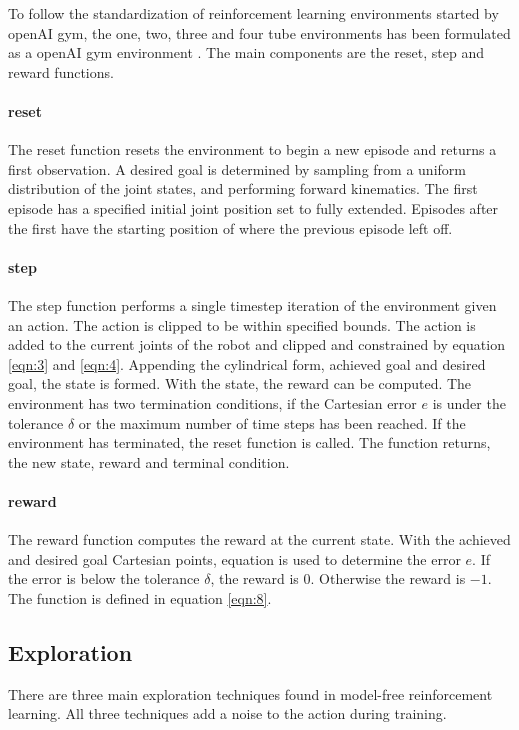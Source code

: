 To follow the standardization of reinforcement learning environments started by openAI gym, the one, two, three and four tube environments has been formulated as a openAI gym environment \cite{Brockman2016}. The main components are the reset, step and reward functions.

\paragraph{reset} The reset function resets the environment to begin a new episode and returns a first observation. A desired goal is determined by sampling from a uniform distribution of the joint states, and performing forward kinematics. The first episode has a specified initial joint position set to fully extended. Episodes after the first have the starting position of where the previous episode left off.

\paragraph{step} The step function performs a single timestep iteration of the environment given an action. The action is clipped to be within specified bounds. The action is added to the current joints of the robot and clipped and constrained by equation \ref{eqn:3} and \ref{eqn:4}. Appending the cylindrical form, achieved goal and desired goal, the state is formed. With the state, the reward can be computed. The environment has two termination conditions, if the Cartesian error $e$ is under the tolerance $\delta$ or the maximum number of time steps has been reached. If the environment has terminated, the reset function is called. The function returns, the new state, reward and terminal condition. 

\paragraph{reward} The reward function computes the reward at the current state. With the achieved and desired goal Cartesian points, equation is used to determine the error $e$. If the error is below the tolerance $\delta$, the reward is $0$. Otherwise the reward is $-1$. The function is defined in equation \ref{eqn:8}.

\subsection{Exploration}
There are three main exploration techniques found in model-free reinforcement learning. All three techniques add a noise to the action during training.

